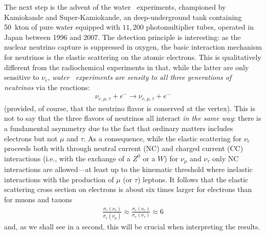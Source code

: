 The next step is the advent of the water \cherenkov\ experiments, championed by
Kamiokande and Super-Kamiokande, an deep-underground tank containing 50~kton of
pure water equipped with $11,200$ photomultiplier tubes, operated in Japan between
1996 and 2007. The detection principle is interesting: as the nuclear neutrino
capture is suppressed in oxygen, the basic interaction mechanism for neutrinos is
the elastic scattering on the atomic electrons. This is qualitatively different from
the radiochemical experiments
in that, while the latter are only sensitive to $\nu_e$, \emph{water \cherenkov\
experiments are sensity to all three generations of neutrinos} via the reactions:
\begin{align*}
  \nu_{e, \mu, \tau} + e^- \rightarrow  \nu_{e, \mu, \tau} + e^-
\end{align*}
(provided, of course, that the neutrino flavor is conserved at the vertex).
This is not to say that the three flavors of neutrinos all interact \emph{in the same way}:
there is a fundamental asymmetry due to the fact that ordinary matters includes
electrons but not $\mu$ and $\tau$. As a consequence, while the elastic scattering
for $\nu_e$ proceeds both with through neutral current (NC) and charged current (CC)
interactions (i.e., with the exchange of a $Z^0$ or a $W$) for $\nu_\mu$ and
$\nu_\tau$ only NC interactions are allowed---at least up to the kinematic threshold
where inelastic interactions with the production of $\mu$ (or $\tau$) leptons.
\todo{Add the relevant Feynman diagrams.}
It follows that the elastic scattering cross section on electrons is about six times
larger for electrons than for muons and tauons
\begin{align*}
  \frac{\sigma_e(\nu_e)}{\sigma_e(\nu_\mu)} \approx
  \frac{\sigma_e(\nu_e)}{\sigma_e(\nu_\tau)} \approx 6
\end{align*}
and, as we shall see in a second, this will be crucial when interpreting the results.

